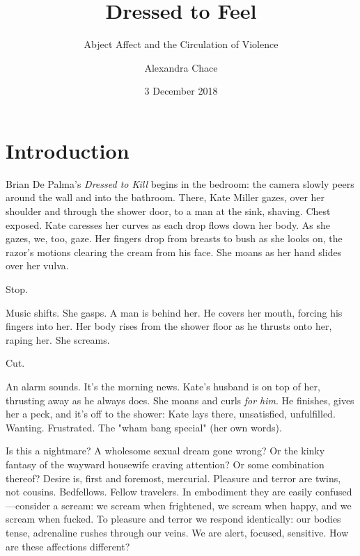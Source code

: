 \documentclass[letterpaper,12pt]{turabian-researchpaper}
\begin{document}
\title{Dressed to Feel}
\subtitle{Abject Affect and the Circulation of Violence}
\author{Alexandra Chace}
\date{3 December 2018}
\maketitle

\section{Introduction}

Brian De Palma's \textit{Dressed to Kill} begins in the bedroom: the camera slowly peers around the wall and into the bathroom. There, Kate Miller gazes, over her shoulder and through the shower door, to a man at the sink, shaving. Chest exposed. Kate caresses her curves as each drop flows down her body. As she gazes, we, too, gaze. Her fingers drop from breasts to bush as she looks on, the razor's motions clearing the cream from his face. She moans as her hand slides over her vulva.

\noindent Stop. 

\noindent Music shifts. She gasps. A man is behind her. He covers her mouth, forcing his fingers into her. Her body rises from the shower floor as he thrusts onto her, raping her. She screams.

\noindent Cut. 

\noindent An alarm sounds. It's the morning news. Kate's husband is on top of her, thrusting away as he always does. She moans and curls \textit{for him}. He finishes, gives her a peck, and it's off to the shower: Kate lays there, unsatisfied, unfulfilled. Wanting. Frustrated. The "wham bang special" (her own words).

Is this a nightmare? A wholesome sexual dream gone wrong? Or the kinky fantasy of the wayward housewife craving attention? Or some combination thereof? Desire is, first and foremost, mercurial. Pleasure and terror are twins, not cousins. Bedfellows. Fellow travelers. In embodiment they are easily confused---consider a scream: we scream when frightened, we scream when happy, and we scream when fucked. To pleasure and terror we respond identically: our bodies tense, adrenaline rushes through our veins. We are alert, focused, sensitive. How are these affections different?
\end{document}
